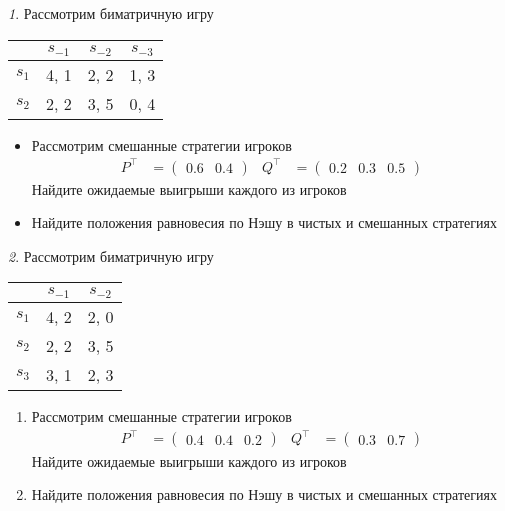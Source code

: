 \documentclass[12pt]{article}
\theoremstyle{remark}
\newtheorem{exercise}{}[subsection]
\begin{document}
\begin{exercise}
Рассмотрим биматричную игру
\begin{center}
	\begin{tabular}{|c||c|c|c|}
	\hline
	& $s_{-1}$ & $s_{-2}$  & $s_{-3}$ \\ \hline \hline
	$s_1$ & 4, 1 & 2, 2 & 1, 3  \\ \hline
	$s_2$ & 2, 2 & 3, 5 & 0, 4 \\ %
	\hline
	\end{tabular}
\end{center}
\begin{itemize}
	\item Рассмотрим смешанные стратегии игроков 
	\begin{align*}
		P^\top&=\begin{pmatrix} 0.6 & 0.4 \end{pmatrix} &
		Q^\top&=\begin{pmatrix} 0.2 & 0.3 & 0.5 \end{pmatrix}
	\end{align*}
	Найдите ожидаемые выигрыши каждого из игроков
	\item Найдите положения равновесия по Нэшу в чистых и смешанных стратегиях
\end{itemize}
\end{exercise}

\begin{exercise}
Рассмотрим биматричную игру
\begin{center}
	\begin{tabular}{|c||c|c|}
	\hline
	& $s_{-1}$ & $s_{-2}$  \\ \hline \hline
	$s_1$ & 4, 2 & 2, 0  \\ \hline
	$s_2$ & 2, 2 & 3, 5  \\ \hline
	$s_3$ & 3, 1 & 2, 3 \\ 
	\hline
	\end{tabular}
\end{center}
\begin{enumerate}
	\item Рассмотрим смешанные стратегии игроков 
	\begin{align*}
		P^\top&=\begin{pmatrix} 0.4 & 0.4 & 0.2 \end{pmatrix} &
		Q^\top&=\begin{pmatrix} 0.3 & 0.7 \end{pmatrix}
	\end{align*}
	Найдите ожидаемые выигрыши каждого из игроков
	\item Найдите положения равновесия по Нэшу в чистых и смешанных стратегиях
\end{enumerate}
\end{exercise}
\end{document}

